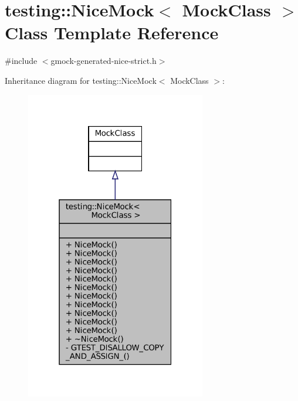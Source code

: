 \hypertarget{classtesting_1_1NiceMock}{}\section{testing\+:\+:Nice\+Mock$<$ Mock\+Class $>$ Class Template Reference}
\label{classtesting_1_1NiceMock}


{\ttfamily \#include $<$gmock-\/generated-\/nice-\/strict.\+h$>$}



Inheritance diagram for testing\+:\+:Nice\+Mock$<$ Mock\+Class $>$\+:
\nopagebreak
\begin{figure}[H]
\begin{center}
\leavevmode
\includegraphics[width=223pt]{classtesting_1_1NiceMock__inherit__graph}
\end{center}
\end{figure}


